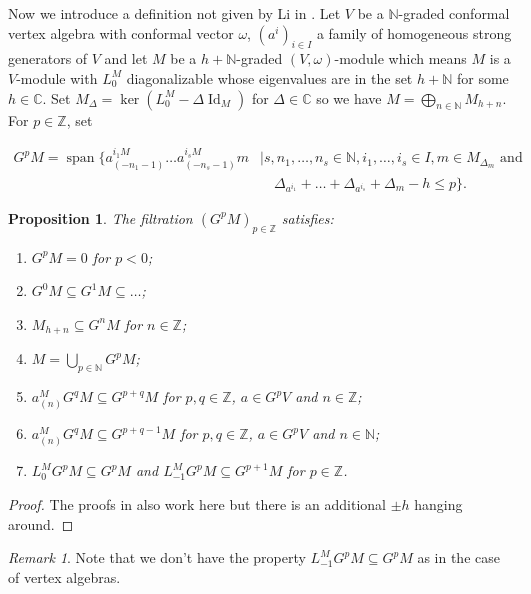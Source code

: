 \documentclass[a4paper, 12pt, reqno]{amsart}
\newtheorem{proposition}[theorem]{Proposition}
\theoremstyle{remark}
\newtheorem{remark}[theorem]{Remark}
\numberwithin{equation}{subsection}
\DeclareMathOperator{\Id}{Id}
\DeclareMathOperator{\vspan}{span}
\begin{document}
Now we introduce a definition not given by Li in \cite{li_vertex_2004}.
Let $V$ be a $\mathbb{N}$-graded conformal vertex algebra with conformal vector $\omega$, $(a^i)_{i \in I}$ a family of homogeneous strong generators of $V$ and let $M$ be a $h + \mathbb{N}$-graded $(V, \omega)$-module which means $M$ is a $V$-module with $L_0^M$ diagonalizable whose eigenvalues are in the set $h + \mathbb{N}$ for some $h \in \mathbb{C}$.
Set $M_\Delta = \ker(L^M_0 - \Delta\Id_M)$ for $\Delta \in \mathbb{C}$ so we have $M = \bigoplus_{n \in \mathbb{N}}M_{h + n}$.
For $p \in \mathbb{Z}$, set

\begin{equation*}
  \begin{split}
    G^pM = \vspan\{a^{i_1M}_{(-n_1 - 1)}\dots a^{i_sM}_{(-n_s - 1)}m &\mid s, n_1, \dots, n_s \in \mathbb{N}, i_1, \dots, i_s \in I, m \in M_{\Delta_m} \text{ and }\\
    &\quad \Delta_{a^{i_1}} + \dots + \Delta_{a^{i_s}} + \Delta_m - h \le p\}.
  \end{split}
\end{equation*}

\begin{proposition}
  \label{prp:11}
  The filtration $(G^pM)_{p \in \mathbb{Z}}$ satisfies:
  \begin{enumerate}
  \item $G^pM = 0$ for $p < 0$;
  \item $G^0M \subseteq G^1M \subseteq \dots$;
  \item $M_{h + n} \subseteq G^nM$ for $n \in \mathbb{Z}$;
  \item $M = \bigcup_{p \in \mathbb{N}}G^pM$;
  \item $a^M_{(n)}G^qM \subseteq G^{p + q}M$ for $p, q \in \mathbb{Z}$, $a \in G^pV$ and $n \in \mathbb{Z}$;
  \item $a^M_{(n)}G^qM \subseteq G^{p + q - 1}M$ for $p, q \in \mathbb{Z}$, $a \in G^pV$ and $n \in \mathbb{N}$;
  \item $L^M_0G^pM \subseteq G^pM$ and $L^M_{-1}G^pM \subseteq G^{p + 1}M$ for $p \in \mathbb{Z}$.
  \end{enumerate}
\end{proposition}

\begin{proof}
  The proofs in \cite{li_vertex_2004} also work here but there is an additional $\pm h$ hanging around.
\end{proof}

\begin{remark}
  \label{rmk:33}
  Note that we don't have the property $L_{-1}^MG^pM \subseteq G^pM$ as in the case of vertex algebras.
\end{remark}
\end{document}
